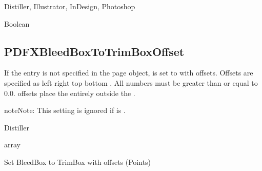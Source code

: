 \documentclass[letterpaper,12pt,english,openany,oneside]{sphinxmanual}
\begin{document}
Distiller, Illustrator, InDesign, Photoshop

\label{\detokenize{PDF_Create_CommonSettings:type-109}}

Boolean

\label{\detokenize{PDF_Create_CommonSettings:ui-name-91}}


\label{\detokenize{PDF_Create_CommonSettings:default-value-104}}

\begin{sphinxVerbatim}[commandchars=\\\{\}]
\end{sphinxVerbatim}


\subsection{PDFXBleedBoxToTrimBoxOffset}
\label{\detokenize{PDF_Create_CommonSettings:pdfxbleedboxtotrimboxoffset}}
If the  entry is not specified in the page object,  is set to  with offsets. Offsets are specified as \sphinxcode{\sphinxupquote{{[}}} left right top bottom \sphinxcode{\sphinxupquote{{]}}} . All numbers must be greater than or equal to 0.0.  offsets place the  entirely outside the  .

\begin{sphinxadmonition}{note}{Note:}
This setting is ignored if  is  .
\end{sphinxadmonition}
\label{\detokenize{PDF_Create_CommonSettings:supported-by-111}}

Distiller

\label{\detokenize{PDF_Create_CommonSettings:type-110}}

array

\label{\detokenize{PDF_Create_CommonSettings:ui-name-92}}

Set BleedBox to TrimBox with offsets (Points)

\label{\detokenize{PDF_Create_CommonSettings:default-value-105}}
\end{document}
